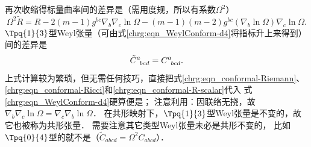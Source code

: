 再次收缩得标量曲率间的差异是（需用度规，所以有系数$\Omega^2$）
\begin{equation}\label{chrg:eqn_conformal-R-scalar}
   \Omega^2\tilde{R}= R -2(m-1) g^{bc} {\nabla}_{b}  {\nabla}_c \ln \Omega
        -(m-1)(m-2)  {g}^{bc}({\nabla}_b \ln\Omega){\nabla}_c \ln\Omega .
\end{equation}
$\Tpq{1}{3}$型Weyl张量（可由式\eqref{chrg:eqn_WeylConform-d4}将指标升上来得到）间的差异是
\begin{equation}\label{chrg:eqn_conformal-Weyl}
    \tilde{C}_{\hphantom{a} bcd}^a = C_{\hphantom{a} bcd}^a .
\end{equation}
上式计算较为繁琐，但无需任何技巧，直接把式\eqref{chrg:eqn_conformal-Riemann}、
\eqref{chrg:eqn_conformal-Ricci}和\eqref{chrg:eqn_conformal-R-scalar}代入
式\eqref{chrg:eqn_WeylConform-d4}硬算便是；
注意利用：因联络无挠，故$\nabla_b \nabla_c \ln \Omega =\nabla_c \nabla_b \ln \Omega$．
在共形映射下，$\Tpq{1}{3}$型Weyl张量是不变的，故它也被称为{\heiti 共形张量}．
需要注意其它类型Weyl张量未必是共形不变的，
比如$\Tpq{0}{4}$型的就不是（$\tilde{C}_{abcd} =\Omega^2 C_{abcd}$）．
